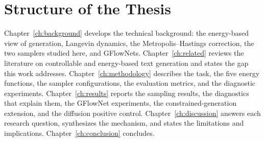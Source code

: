 \section{Structure of the Thesis}
\label{sec:intro-structure}

Chapter~\ref{ch:background} develops the technical background: the energy-based view of generation, Langevin dynamics, the Metropolis--Hastings correction, the two samplers studied here, and GFlowNets. Chapter~\ref{ch:related} reviews the literature on controllable and energy-based text generation and states the gap this work addresses. Chapter~\ref{ch:methodology} describes the task, the five energy functions, the sampler configurations, the evaluation metrics, and the diagnostic experiments. Chapter~\ref{ch:results} reports the sampling results, the diagnostics that explain them, the GFlowNet experiments, the constrained-generation extension, and the diffusion positive control. Chapter~\ref{ch:discussion} answers each research question, synthesizes the mechanism, and states the limitations and implications. Chapter~\ref{ch:conclusion} concludes.
